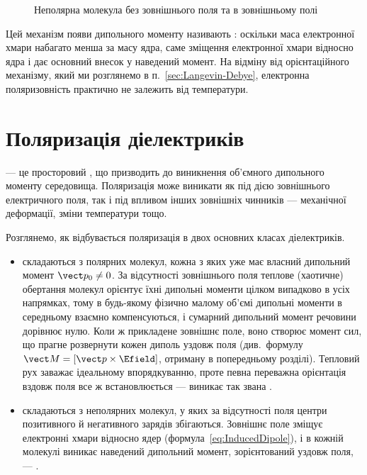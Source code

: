 \begin{figure}[h!]\centering
	\caption{Неполярна молекула без зовнішнього поля та в зовнішньому полі\label{pic:InducedDipole}}
\end{figure}

Цей механізм появи дипольного моменту називають : оскільки маса електронної хмари набагато менша за
масу ядра, саме зміщення електронної хмари відносно ядра і дає основний внесок у наведений момент. На відміну від орієнтаційного механізму, який ми
розглянемо в п.~\ref{sec:Langevin-Debye}, електронна поляризовність практично не залежить від температури.

\section{Поляризація діелектриків}

\begin{Attention}
	 --- це просторовий , що призводить до виникнення об'ємного дипольного моменту
	середовища. Поляризація може виникати як під дією зовнішнього електричного поля, так і під впливом інших зовнішніх чинників --- механічної
	деформації, зміни температури тощо.
\end{Attention}

Розглянемо, як відбувається поляризація в двох основних класах діелектриків.

\begin{itemize}
	\item {} складаються з полярних молекул, кожна з яких уже має власний дипольний момент $\vect p_0 \neq 0$. За
	      відсутності зовнішнього поля теплове (хаотичне) обертання молекул орієнтує їхні дипольні моменти цілком випадково в усіх напрямках, тому в
	      будь-якому фізично малому об'ємі дипольні моменти в середньому взаємно компенсуються, і сумарний дипольний момент речовини дорівнює нулю.
	      Коли ж прикладене зовнішнє поле, воно створює момент сил, що прагне розвернути кожен диполь уздовж поля (див.~формулу
	      $\vect M = [\vect p\times\Efield]$, отриману в попередньому розділі). Тепловий рух заважає ідеальному впорядкуванню, проте певна переважна
	      орієнтація вздовж поля все ж встановлюється --- виникає так звана .
	\item {} складаються з неполярних молекул, у яких за відсутності поля центри позитивного й негативного зарядів
	      збігаються. Зовнішнє поле зміщує електронні хмари відносно ядер (формула~\eqref{eq:InducedDipole}), і в кожній молекулі виникає наведений
	      дипольний момент, зорієнтований уздовж поля, --- .
\end{itemize}

